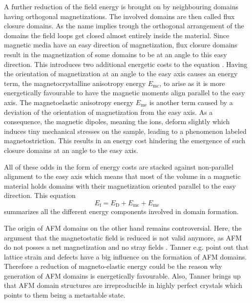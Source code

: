 A further reduction of the field energy is brought on by neighbouring domains having orthogonal magnetizations.
The involved domains are then called flux closure domains.
As the name implies trough the orthogonal arrangement of the domains the field loops get closed almost entirely inside the material.
Since magnetic media have an easy direction of magnetization, flux closure domains result in the magnetization of some domains to be at an angle to this easy direction.
This introduces two additional energetic costs to the equation \cite{feynman_mainly_2007}.
Having the orientation of magnetization at an angle to the easy axis causes an energy term, the magnetocrystalline anisotropy energy $E_{\text{mc}}$, to arise as it is more energetically favourable to have the magnetic moments align parallel to the easy axis.
The magnetoelastic anisotropy energy $E_{\text{me}}$ is another term caused by a deviation of the orientation of magnetization from the easy axis.
As a consequence, the magnetic dipoles, meaning the ions, deform slightly which induces tiny mechanical stresses on the sample, leading to a phenomenon labeled magnetostriction.
This results in an energy cost hindering the emergence of such closure domains at an angle to the easy axis.

All of these odds in the form of energy costs are stacked against non-parallel alignment to the easy axis which means that most of the volume in a magnetic material holds domains with their magnetization oriented parallel to the easy direction.
This equation
\begin{equation}
    E_{\text{f}} = E_{\text{D}} + E_{\text{mc}} + E_{\text{me}}
    \label{eqn:landau_lifschitz_energy}
\end{equation}
summarizes all the different energy components involved in domain formation.

The origin of AFM domains on the other hand remains controversial.
Here, the argument that the magnetostatic field is reduced is not valid anymore, as AFM do not posses a net magnetization and no stray fields \cite{tanner_antiferromagnetic_1979}.
Tanner e.g. point out that lattice strain and defects have a big influence on the formation of AFM domains.
Therefore a reduction of magneto-elastic energy could be the reason why generation of AFM domains is energetically favourable.
Also, Tanner brings up that AFM domain structures are irreproducible in highly perfect crystals which points to them being a metastable state.


